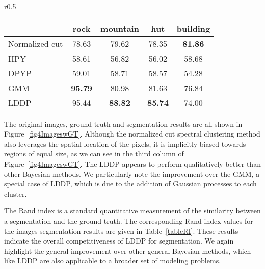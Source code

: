 \documentclass[runningheads,a4paper]{iscide}
\begin{document}




\begin{wraptable}{r}{0.5\textwidth}\vspace{-20pt}
\footnotesize
\begin{tabular}{l|cccc}
 & rock & mountain & hut & building\\
\hline
Normalized cut  &78.63  &79.62 &78.35 &{\bf 81.86}\\
HPY  &58.61	&56.82	&56.02	&58.68\\
DPYP &59.01	&58.71	&58.57	&54.28\\
GMM  &{\bf 95.79}  & 80.98 & 81.63 &76.84\\
LDDP  &95.44  &{\bf 88.82} &{\bf 85.74} &74.00\\
 \hline
\end{tabular}
\caption{Comparison of Rand index values (\%).}\vspace{-10pt}
\label{tableRI}
\end{wraptable}


The original images, ground truth and segmentation results are all shown
in Figure~\ref{fig4ImageswGT}.
Although the normalized cut spectral clustering method also leverages
the spatial location of the pixels,
it  is implicitly biased towards regions of equal size,
 as we can see in the third column of Figure~\ref{fig4ImageswGT}. The LDDP appears to perform qualitatively better than other Bayesian methods. We particularly note the improvement over the GMM, a special case of LDDP, which is due to the addition of Gaussian processes to each cluster.

The Rand index is a standard quantitative measurement of the
similarity between a segmentation and the ground truth. The
corresponding Rand index values for the images segmentation results
are given in Table~\ref{tableRI}. These results indicate the overall competitiveness of LDDP for segmentation. We again highlight the general improvement over other general Bayesian methods, which like LDDP are also applicable to a broader set of modeling problems.
\end{document}
